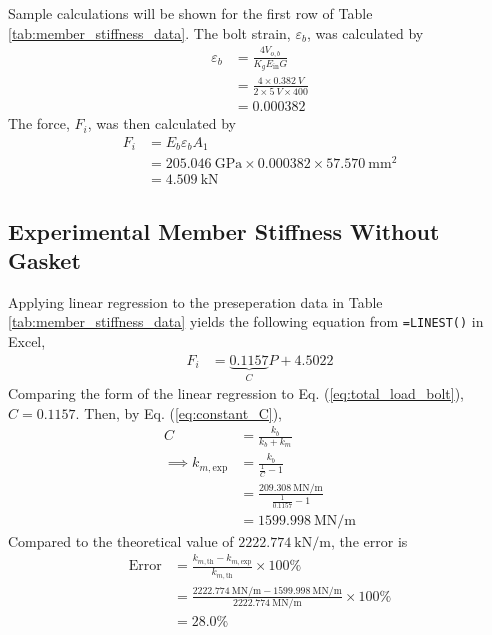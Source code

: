 Sample calculations will be shown for the first row of Table \ref{tab:member_stiffness_data}. The bolt strain, $\varepsilon_b$, was calculated by
\begin{align*}
    \varepsilon_b &= \frac{4 V_{o,b}}{K_g E_{\text{in}} G} \\
    &= \frac{4 \times \qty{0.382}{V}}{2 \times \qty{5}{V} \times 400} \\
    &= \qty{0.000382}{}
\end{align*}
The force, $F_i$, was then calculated by
\begin{align*}
    F_i &= E_b \varepsilon_b A_1 \\
    &= \qty{205.046}{\giga\pascal} \times \qty{0.000382} \times \qty{57.570}{\milli\meter\squared} \\
    &= \boxed{\qty{4.509}{\kilo\newton}}
\end{align*}

\subsection{Experimental Member Stiffness Without Gasket}
Applying linear regression to the preseperation data in Table \ref{tab:member_stiffness_data} yields the following equation from \texttt{=LINEST()} in Excel,
\begin{align*}
    F_i &= \underbrace{0.1157}_{C} P + 4.5022
\end{align*}
Comparing the form of the linear regression to Eq. (\ref{eq:total_load_bolt}), $C = 0.1157$. Then, by Eq. (\ref{eq:constant_C}), 
\begin{align*}
    C &= \frac{k_b}{k_b + k_m} \\
    \implies k_{m, \text{exp}} &= \frac{k_b}{\frac{1}{C} - 1} \\
    &= \frac{\qty{209.308}{\mega\newton\per\meter}}{\frac{1}{0.1157} - 1} \\
    &= \boxed{\qty{1599.998}{\mega\newton\per\meter}}
\end{align*}
Compared to the theoretical value of $\qty{2222.774}{\kilo\newton\per\meter}$, the error is
\begin{align*}
    \text{Error} &= \frac{k_{m, \text{th}} - k_{m, \text{exp}}}{k_{m, \text{th}}} \times 100\% \\
    &= \frac{\qty{2222.774}{\mega\newton\per\meter} - \qty{1599.998}{\mega\newton\per\meter}}{\qty{2222.774}{\mega\newton\per\meter}} \times 100\% \\
    &= \boxed{28.0\%}
\end{align*}

